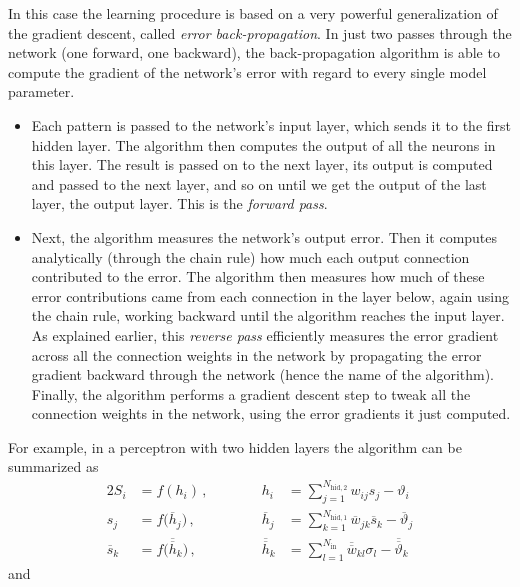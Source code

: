In this case the learning procedure is based on a very powerful generalization of the gradient descent, called \emph{error back-propagation}. In just two passes through the network (one forward, one backward), the back-propagation algorithm is able to compute the gradient of the network's error with regard to every single model parameter.
\begin{itemize}
\item Each pattern is passed to the network's input layer, which sends it to the first hidden layer. The algorithm then computes the output of all the neurons in this layer. The result is passed on to the next layer, its output is computed and passed to the next layer, and so on until we get the output of the last layer, the output layer. This is the \emph{forward pass}.
\item Next, the algorithm measures the network's output error. Then it computes analytically (through the chain rule) how much each output connection contributed to the error. The algorithm then measures how much of these error contributions came from each connection in the layer below, again using the chain rule, working backward until the algorithm reaches the input layer. As explained earlier, this \emph{reverse pass} efficiently measures the error gradient across all the connection weights in the network by propagating the error gradient backward through the network (hence the name of the algorithm). Finally, the algorithm performs a gradient descent step to tweak all the connection weights in the network, using the error gradients it just computed.
\end{itemize}
For example, in a perceptron with two hidden layers the algorithm can be summarized as
\begin{alignat}{2}
S_i&=f(h_i)\,, &\qquad\quad h_i&=\sum_{j=1}^{N_{\text{hid},2}}w_{ij}s_j-\vartheta_i\label{eq4:outputlayer}\\
s_j&=f\bigl(\overline{h}_j\bigr)\,, &\qquad\quad \overline{h}_j&=\sum_{k=1}^{N_{\text{hid},1}}\overline{w}_{jk}\overline{s}_k-\overline{\vartheta}_j\\
\overline{s}_k&=f\bigl(\overline{\overline{h}}_k\bigr)\,, &\qquad\quad \overline{\overline{h}}_k&=\sum_{l=1}^{N_{\text{in}}}\overline{\overline{w}}_{kl}\sigma_l-\overline{\overline{\vartheta}}_k\label{eq4:hid1}
\end{alignat}
and
